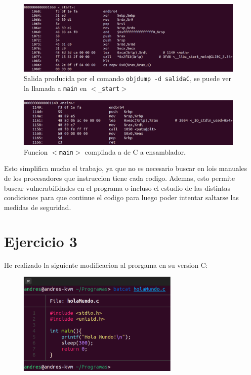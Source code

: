\documentclass{article}
\begin{document}
\begin{figure}[H]
    \includegraphics[width=\textwidth]{imagenes/Captura desde 2022-11-17 17-53-55.png}
    \caption{Salida producida por el comando \texttt{objdump -d salidaC}, se puede ver la llamada a \texttt{main} en \texttt{$<$\_start$>$}}
\end{figure}


\begin{figure}[H]
    \includegraphics[width=\textwidth]{imagenes/Captura desde 2022-11-17 17-56-56.png}
    \caption{Funcion \texttt{$<$main$>$} compilada a de C a ensamblador.}
\end{figure}

Esto simplifica mucho el trabajo, ya que no es necesario buscar en lois manuales de los procesadores que instruccion tiene cada codigo. Ademas, esto permite buscar vulnerabilidades en el programa o incluso el estudio de las distintas condiciones para que continue el codigo para luego poder intentar saltarse las medidas de seguridad.

\bigskip

\section*{Ejercicio 3}

He realizado la siguiente modificacion al prorgama en su version C:

\begin{figure}[H]
    \centering
    \includegraphics[width=0.7\textwidth]{imagenes/Captura desde 2022-11-17 18-12-25.png}
\end{figure}
\end{document}
